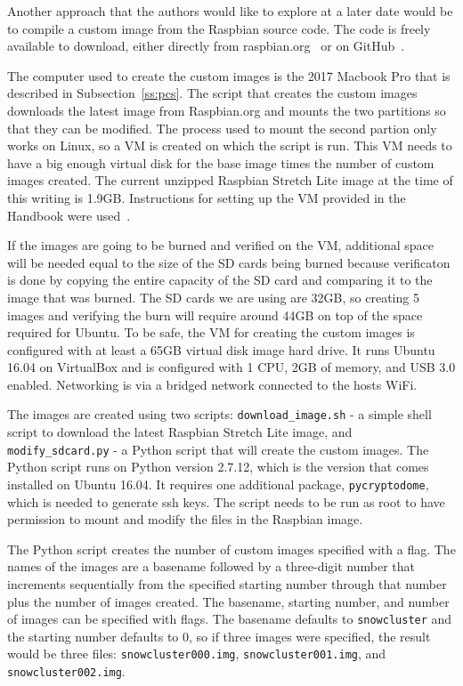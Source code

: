 Another approach that the authors would like to explore at a later
date would be to compile a custom image from the Raspbian source
code. The code is freely available to download, either directly from
raspbian.org~\cite{hid-sp18-419-raspbian-distro} or on
GitHub~\cite{hid-sp18-419-pi-gen}.

The computer used to create the custom images is the 2017 Macbook Pro
that is described in Subsection~\ref{ss:pcs}. The script that creates
the custom images downloads the latest image from Raspbian.org and
mounts the two partitions so that they can be modified. The process
used to mount the second partion only works on Linux, so a VM is
created on which the script is run. This VM needs to have a big enough
virtual disk for the base image times the number of custom images
created. The current unzipped Raspbian Stretch Lite image at the time
of this writing is 1.9GB. Instructions for setting up the VM provided
in the Handbook were used~\cite{las18handbook}.

If the images are going to be burned and verified on the VM,
additional space will be needed equal to the size of the SD cards
being burned because verificaton is done by copying the entire
capacity of the SD card and comparing it to the image that was
burned. The SD cards we are using are 32GB, so creating 5 images and
verifying the burn will require around 44GB on top of the space
required for Ubuntu. To be safe, the VM for creating the custom images
is configured with at least a 65GB virtual disk image hard drive.  It
runs Ubuntu 16.04 on VirtualBox and is configured with 1 CPU, 2GB of
memory, and USB 3.0 enabled. Networking is via a bridged network
connected to the hosts WiFi.

The images are created using two scripts: \verb|download_image.sh| - a
simple shell script to download the latest Raspbian Stretch Lite
image, and \verb|modify_sdcard.py| - a Python script that will create
the custom images. The Python script runs on Python version 2.7.12,
which is the version that comes installed on Ubuntu 16.04. It requires
one additional package, \verb|pycryptodome|, which is needed to
generate ssh keys. The script needs to be run as root to have
permission to mount and modify the files in the Raspbian image.

The Python script creates the number of custom images specified with a
flag. The names of the images are a basename followed by a three-digit
number that increments sequentially from the specified starting number
through that number plus the number of images created. The basename,
starting number, and number of images can be specified with flags. The
basename defaults to \verb|snowcluster| and the starting number
defaults to 0, so if three images were specified, the result would be
three files: \verb|snowcluster000.img|, \verb|snowcluster001.img|,
and \verb|snowcluster002.img|.

